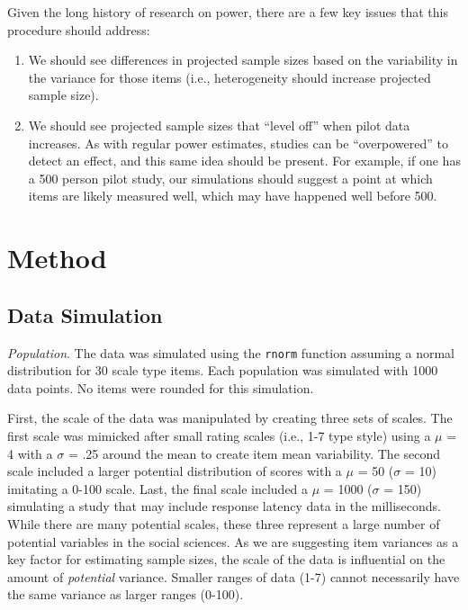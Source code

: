 \documentclass[
  man]{apa6}
\providecommand{\tightlist}{%
  \setlength{\itemsep}{0pt}\setlength{\parskip}{0pt}}
\begin{document}
Given the long history of research on power, there are a few key issues that this procedure should address:

\begin{enumerate}
\def\labelenumi{\arabic{enumi})}
\tightlist
\item
  We should see differences in projected sample sizes based on the variability in the variance for those items (i.e., heterogeneity should increase projected sample size).
\item
  We should see projected sample sizes that ``level off'' when pilot data increases. As with regular power estimates, studies can be ``overpowered'' to detect an effect, and this same idea should be present. For example, if one has a 500 person pilot study, our simulations should suggest a point at which items are likely measured well, which may have happened well before 500.
\end{enumerate}

\hypertarget{method}{%
\section{Method}\label{method}}

\hypertarget{data-simulation}{%
\subsection{Data Simulation}\label{data-simulation}}

\emph{Population}. The data was simulated using the \texttt{rnorm} function assuming a normal distribution for 30 scale type items. Each population was simulated with 1000 data points. No items were rounded for this simulation.

First, the scale of the data was manipulated by creating three sets of scales. The first scale was mimicked after small rating scales (i.e., 1-7 type style) using a \(\mu\) = 4 with a \(\sigma\) = .25 around the mean to create item mean variability. The second scale included a larger potential distribution of scores with a \(\mu\) = 50 (\(\sigma\) = 10) imitating a 0-100 scale. Last, the final scale included a \(\mu\) = 1000 (\(\sigma\) = 150) simulating a study that may include response latency data in the milliseconds. While there are many potential scales, these three represent a large number of potential variables in the social sciences. As we are suggesting item variances as a key factor for estimating sample sizes, the scale of the data is influential on the amount of \emph{potential} variance. Smaller ranges of data (1-7) cannot necessarily have the same variance as larger ranges (0-100).
\end{document}
